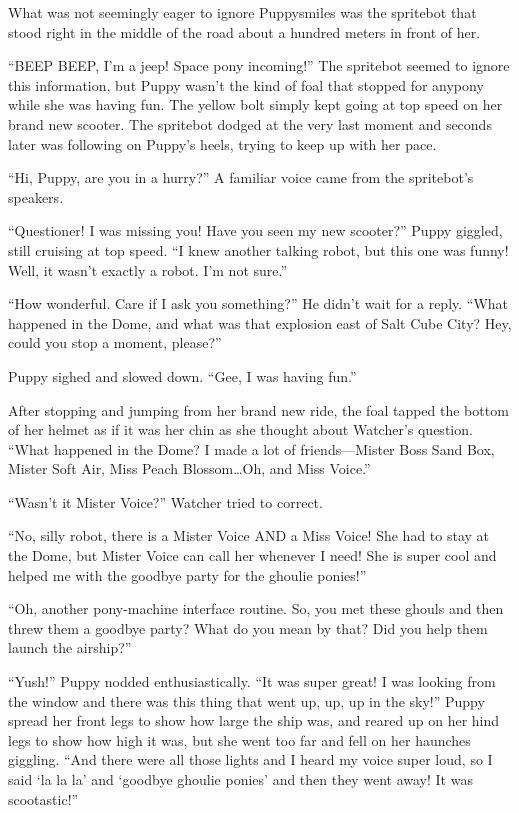 What was not seemingly eager to ignore Puppysmiles was the spritebot that stood right in the middle of the road about a hundred meters in front of her.

``BEEP BEEP, I'm a jeep! Space pony incoming!'' The spritebot seemed to ignore this information, but Puppy wasn't the kind of foal that stopped for anypony while she was having fun. The yellow bolt simply kept going at top speed on her brand new scooter. The spritebot dodged at the very last moment and seconds later was following on Puppy's heels, trying to keep up with her pace.

``Hi, Puppy, are you in a hurry?'' A familiar voice came from the spritebot's speakers.

``Questioner! I was missing you! Have you seen my new scooter?'' Puppy giggled, still cruising at top speed. ``I knew another talking robot, but this one was funny! Well, it wasn't exactly a robot. I'm not sure.''

``How wonderful. Care if I ask you something?'' He didn't wait for a reply. ``What happened in the Dome, and what was that explosion east of Salt Cube City? Hey, could you stop a moment, please?''

Puppy sighed and slowed down. ``Gee, I was having fun.''

After stopping and jumping from her brand new ride, the foal tapped the bottom of her helmet as if it was her chin as she thought about Watcher's question. ``What happened in the Dome? I made a lot of friends---Mister Boss Sand Box, Mister Soft Air, Miss Peach Blossom\dots Oh, and Miss Voice.''

``Wasn't it Mister Voice?'' Watcher tried to correct.

``No, silly robot, there is a Mister Voice AND a Miss Voice! She had to stay at the Dome, but Mister Voice can call her whenever I need! She is super cool and helped me with the goodbye party for the ghoulie ponies!''

``Oh, another pony-machine interface routine. So, you met these ghouls and then threw them a goodbye party? What do you mean by that? Did you help them launch the airship?''

``Yush!'' Puppy nodded enthusiastically. ``It was super great! I was looking from the window and there was this  thing that went up, up, up in the sky!'' Puppy spread her front legs to show how large the ship was, and reared up on her hind legs to show how high it was, but she went too far and fell on her haunches giggling. ``And there were all those lights and I heard my voice super loud, so I said `la la la' and `goodbye ghoulie ponies' and then they went away! It was scootastic!''

